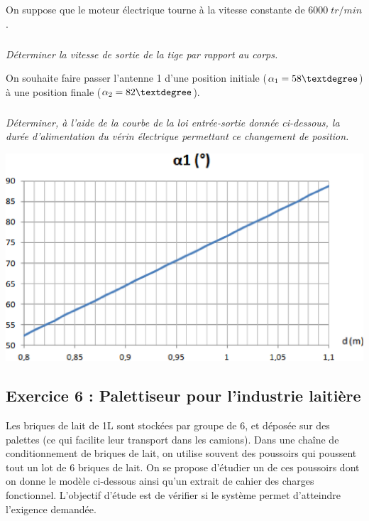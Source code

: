 \documentclass[10pt,fleqn]{article} %
\begin{document}
\begin{multicols}{2}
On suppose que le moteur électrique tourne à la vitesse constante de $6000\; tr/min$. 


\subparagraph{}
\textit{Déterminer la vitesse de sortie de la tige par rapport au corps.}

\ifprof
\begin{corrige}
\end{corrige}
\else \fi


On souhaite faire passer l’antenne 1 d’une position initiale ($\alpha_1 = 58\textdegree$) à une position finale ($\alpha_2 = 82\textdegree$).

\subparagraph{}
\textit{Déterminer, à l’aide de la courbe de la loi entrée-sortie donnée ci-dessous, la durée d’alimentation du vérin électrique permettant ce changement de position. }

\ifprof
\begin{corrige}
\end{corrige}
\else \fi

\begin{center}
\includegraphics[width=.8\linewidth]{images/fig9} 
\end{center}

\newpage
\subsection*{Exercice 6 : Palettiseur pour l'industrie laitière}
\setcounter{exo}{0}
Les briques de lait de 1L sont stockées par groupe de 6, et déposée sur des palettes (ce qui facilite leur transport dans les camions). Dans une chaîne de conditionnement de briques de lait, on utilise souvent des poussoirs qui poussent tout un lot de 6 briques de lait. On se propose d'étudier un de ces poussoirs dont on donne le modèle ci-dessous ainsi qu’un extrait de cahier des charges fonctionnel. L'objectif d’étude est de vérifier si le système permet d'atteindre l’exigence demandée. 


\end{multicols}
\end{document}
